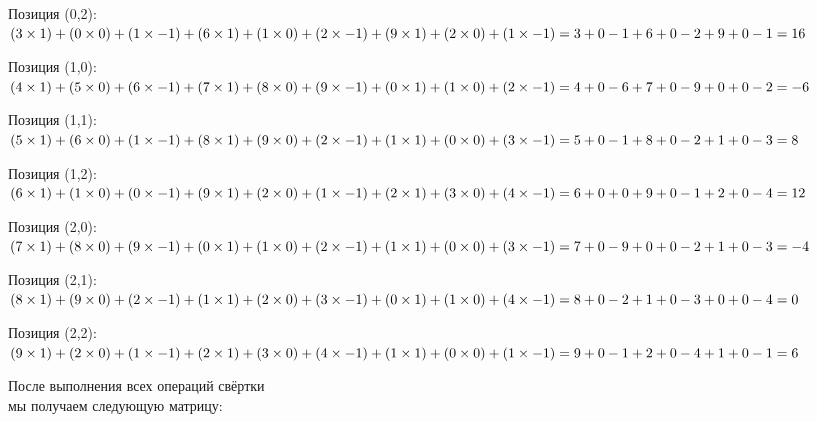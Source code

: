 \begin{description}
Позиция (0,2):
$
(3 \times 1) + (0 \times 0) + (1 \times -1) + \\
(6 \times 1) + (1 \times 0) + (2 \times -1) + \\
(9 \times 1) + (2 \times 0) + (1 \times -1) = \\
3 + 0 - 1 + 6 + 0 - 2 + 9 + 0 - 1 = 16
$

Позиция (1,0):
$
(4 \times 1) + (5 \times 0) + (6 \times -1) + \\
(7 \times 1) + (8 \times 0) + (9 \times -1) + \\
(0 \times 1) + (1 \times 0) + (2 \times -1) = \\
4 + 0 - 6 + 7 + 0 - 9 + 0 + 0 - 2 = -6
$

Позиция (1,1):
$
(5 \times 1) + (6 \times 0) + (1 \times -1) + \\
(8 \times 1) + (9 \times 0) + (2 \times -1) + \\
(1 \times 1) + (0 \times 0) + (3 \times -1) = \\
5 + 0 - 1 + 8 + 0 - 2 + 1 + 0 - 3 = 8
$

Позиция (1,2):
$
(6 \times 1) + (1 \times 0) + (0 \times -1) + \\
(9 \times 1) + (2 \times 0) + (1 \times -1) + \\
(2 \times 1) + (3 \times 0) + (4 \times -1) = \\
6 + 0 + 0 + 9 + 0 - 1 + 2 + 0 - 4 = 12
$

Позиция (2,0):
$
(7 \times 1) + (8 \times 0) + (9 \times -1) + \\
(0 \times 1) + (1 \times 0) + (2 \times -1) + \\
(1 \times 1) + (0 \times 0) + (3 \times -1) = \\
7 + 0 - 9 + 0 + 0 - 2 + 1 + 0 - 3 = -4
$

Позиция (2,1):
$
(8 \times 1) + (9 \times 0) + (2 \times -1) + \\
(1 \times 1) + (2 \times 0) + (3 \times -1) + \\
(0 \times 1) + (1 \times 0) + (4 \times -1) = \\
8 + 0 - 2 + 1 + 0 - 3 + 0 + 0 - 4 = 0
$

Позиция (2,2):
$
(9 \times 1) + (2 \times 0) + (1 \times -1) + \\
(2 \times 1) + (3 \times 0) + (4 \times -1) + \\
(1 \times 1) + (0 \times 0) + (1 \times -1) = \\
9 + 0 - 1 + 2 + 0 - 4 + 1 + 0 - 1 = 6
$

После выполнения всех операций свёртки\\
мы получаем следующую матрицу:


\end{description}
